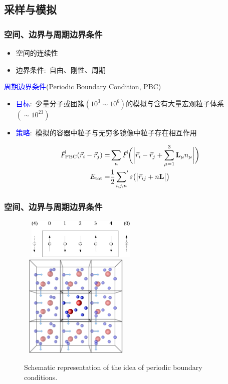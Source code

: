 \subsection{采样与模拟}
\frame
{
	\frametitle{空间、边界与周期边界条件}
	\begin{itemize}
		\item 空间的连续性
			\vskip 2pt
			{\fontsize{8.5pt}{1.2pt}}
		\item 边界条件:~自由、刚性、周期
	\end{itemize}
	\textcolor{blue}{周期边界条件}\textrm{(Periodic Boundary Condition, PBC)}\\
	\begin{itemize}
		\item \textcolor{blue}{目标}:~少量分子或团簇$(10^3\sim10^6)$的模拟与含有大量宏观粒子体系$(\sim10^{23})$
		\item \textcolor{blue}{策略}:~模拟的容器中粒子与无穷多镜像中粒子存在相互作用
	\end{itemize}
	\begin{displaymath}
		\begin{aligned}
			\vec F_{\mathrm{PBC}}(\vec r_i-\vec r_j)=&\sum_n\vec F\bigg(\bigg|\vec r_i-\vec r_j+\sum_{\mu=1}^3\mathbf{L}_{\mu}n_{\mu}\bigg|\bigg)\\
			E_{\mathrm{tot}}=&\dfrac12\sideset{}{^{\prime}}\sum_{i,j,n}\varepsilon\big(\big|\vec r_{ij}+n\mathbf{L}\big|\big)
		\end{aligned}
	\end{displaymath}
}

\frame
{
	\frametitle{空间、边界与周期边界条件}
\begin{figure}[h!]
\centering
\vspace*{-0.15in}
\includegraphics[height=0.75in,width=2.35in,viewport=0 0 460 170,clip]{Figures/Periodic-boundary-conditions-on-a-spin-lattice.jpg}
\vskip 1pt
\includegraphics[height=1.95in,width=2.15in,viewport=0 0 300 300,clip]{Figures/Periodic-boundary-conditions.png}
\caption{\tiny \textrm{Schematic representation of the idea of periodic boundary conditions.}}%
\label{Periodic_boundary_conditions}
\end{figure}
}

